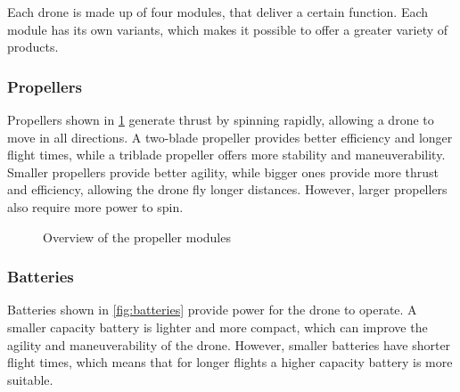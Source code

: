 \documentclass[sigconf,review]{acmart}
\begin{document}
Each drone is made up of four modules, that deliver a certain function. 
Each module has its own variants, which makes it possible to offer a greater variety of products. 

\subsubsection{Propellers}
\label{sec:propellers}

Propellers shown in \cref{fig:propeller} generate thrust by spinning rapidly, allowing a drone to move in all directions. 
A two-blade propeller provides better efficiency and longer flight times, while a triblade propeller offers more stability and maneuverability. 
Smaller propellers provide better agility, while bigger ones provide more thrust and efficiency, allowing the drone fly longer distances. 
However, larger propellers also require more power to spin.

\begin{figure}[htbp]
    \hfill
    \hfill
    \caption{Overview of the propeller modules}
    \label{fig:propeller}
\end{figure}

\subsubsection{Batteries}
\label{sec:batteries}

Batteries shown in \cref{fig:batteries} provide power for the drone to operate. 
A smaller capacity battery is lighter and more compact, which can improve the agility and maneuverability of the drone. 
However, smaller batteries have shorter flight times, which means that for longer flights a higher capacity battery is more suitable.
\end{document}
